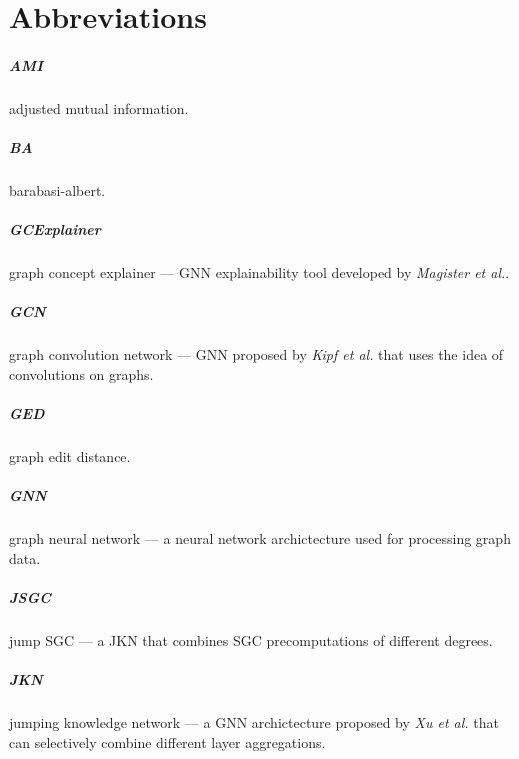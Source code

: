\chapter{Abbreviations}

\paragraph{AMI}
adjusted mutual information.

\paragraph{BA}
barabasi-albert.

\paragraph{GCExplainer}
graph concept explainer --- GNN explainability tool developed by \textit{Magister et al.}\cite{magister2021gcexplainer}.

\paragraph{GCN}
graph convolution network --- GNN proposed by \textit{Kipf et al.}\cite{kipf2016semi} that uses the idea of convolutions on graphs.

\paragraph{GED}
graph edit distance.

\paragraph{GNN}
graph neural network --- a neural network archictecture used for processing graph data.

\paragraph{JSGC}
jump SGC --- a JKN that combines SGC precomputations of different degrees.

\paragraph{JKN}
jumping knowledge network --- a GNN archictecture proposed by \textit{Xu et al.}\cite{xu2018representation} that can selectively combine different layer aggregations.

